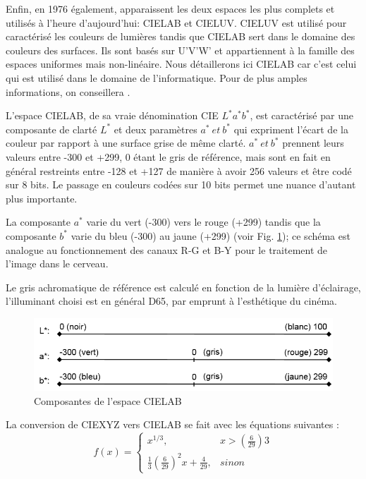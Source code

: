 	\par Enfin, en 1976 également, apparaissent les deux espaces les plus complets et utilisés à l'heure d'aujourd'hui: CIELAB et CIELUV. CIELUV est utilisé pour caractérisé les couleurs de lumières tandis que CIELAB sert dans le domaine des couleurs des surfaces. Ils sont basés sur U'V'W' et appartiennent à la famille des espaces uniformes mais non-linéaire. Nous détaillerons ici CIELAB car c'est celui qui est utilisé dans le domaine de l'informatique. Pour de plus amples informations, on conseillera \citep{schanda_colorimetry:_2007}.
	
	\par L'espace CIELAB, de sa vraie dénomination CIE $L^\ast a^\ast b^\ast$, est caractérisé par une composante de clarté $L^\ast$ et deux paramètres $a^\ast~et~b^\ast$ qui expriment l'écart de la couleur par rapport à une surface grise de même clarté.
	$a^\ast~et~b^\ast$ prennent leurs valeurs entre -300 et +299, 0 étant le gris de référence, mais sont en fait en général restreints entre -128 et +127 de manière à avoir 256 valeurs et être codé sur 8 bits. Le passage en couleurs codées sur 10 bits permet une nuance d'autant plus importante.
	
	\par La composante $a^\ast$ varie du vert (-300) vers le rouge (+299) tandis que la composante $b^\ast$ varie du bleu (-300) au jaune (+299) (voir Fig. \ref{fig:cielab_axes}); ce schéma est analogue au fonctionnement des canaux R-G et B-Y pour le traitement de l'image dans le cerveau.
	
	\par Le gris achromatique de référence est calculé en fonction de la lumière d'éclairage, l'illuminant choisi est en général D65, par emprunt à l'esthétique du cinéma.
	
	\begin{figure}
		\centering
		\includegraphics[scale=1]{Figures/CIELABAxes}
		\caption{Composantes de l'espace CIELAB}
		\label{fig:cielab_axes}
	\end{figure}
	
	\par La conversion de CIEXYZ vers CIELAB se fait avec les équations suivantes \citep{robertson_historical_1990}:
	\begin{equation}
		f(x)=  \begin{cases}
		x^{1/3}, & x>\left(\frac{6}{29}\right)3\\
		\frac{1}{3}\left(\frac{6}{29}\right)^2x + \frac{4}{29}, & sinon
		\end{cases}
		\label{eq:xyz_to_lab}
	\end{equation}
	

